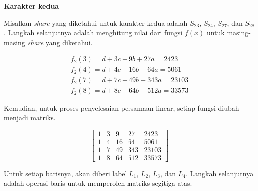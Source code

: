 \begin{flushleft}
	\textbf{Karakter kedua}
\end{flushleft}

Misalkan \textit{share} yang diketahui untuk karakter kedua adalah \begin{math}S_{23}\end{math}, \begin{math}S_{24}\end{math}, \begin{math}S_{27}\end{math}, dan \begin{math}S_{28}\end{math}. Langkah selanjutnya adalah menghitung nilai dari fungsi \begin{math}f(x)\end{math} untuk masing-masing \textit{share} yang diketahui.

\begin{gather*}
	f_2(3) = d + 3c + 9b + 27a = 2423 \\
	f_2(4) = d + 4c + 16b + 64a = 5061 \\
	f_2(7) = d + 7c + 49b + 343a = 23103 \\
	f_2(8) = d + 8c + 64b + 512a = 33573
\end{gather*}

Kemudian, untuk proses penyelesaian persamaan linear, setiap fungsi diubah menjadi matriks.

\begin{center}
	\setlength\arraycolsep{15pt}
	\[
	\begin{bmatrix}
			1 	& 3 	& 9 	& 27 		& 2423 		\\[1em]
			1 	& 4 	& 16 	& 64 		& 5061		\\[1em]
			1 	& 7 	& 49 	& 343 	& 23103		\\[1em]
			1 	& 8 	& 64 	& 512 	& 33573
	\end{bmatrix}
	\]
\end{center}

Untuk setiap barisnya, akan diberi label \begin{math}L_1\end{math}, \begin{math}L_2\end{math}, \begin{math}L_3\end{math}, dan \begin{math}L_4\end{math}. Langkah selanjutnya adalah operasi baris untuk memperoleh matriks segitiga atas.

